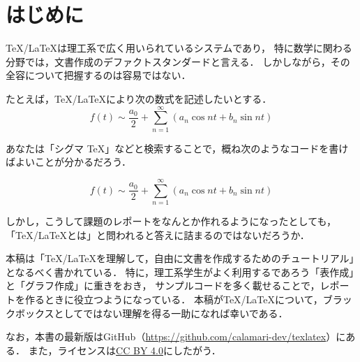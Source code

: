 \documentclass[../index]{subfiles}
\begin{document}
\chapter{はじめに}
\TeX /\LaTeX は理工系で広く用いられているシステムであり，
特に数学に関わる分野では，文書作成のデファクトスタンダードと言える．
しかしながら，その全容について把握するのは容易ではない．

たとえば，\TeX /\LaTeX により次の数式を記述したいとする．
\[
  f(t) \sim \frac{a_0}{2} + \sum_{n=1}^\infty (a_n\cos nt + b_n\sin nt)
\]

あなたは「シグマ TeX」などと検索することで，概ね次のようなコードを書けばよいことが分かるだろう．
\begin{codeblock}
\[
  f(t) \sim \frac{a_0}{2} + \sum_{n=1}^\infty (a_n\cos nt + b_n\sin nt)
\]
\end{codeblock}

しかし，こうして課題のレポートをなんとか作れるようになったとしても，
「\TeX /\LaTeX とは」と問われると答えに詰まるのではないだろうか．

本稿は「\TeX /\LaTeX を理解して，自由に文書を作成するためのチュートリアル」となるべく書かれている．
特に，理工系学生がよく利用するであろう「表作成」と「グラフ作成」に重きをおき，
サンプルコードを多く載せることで，レポートを作るときに役立つようになっている．
本稿が\TeX /\LaTeX について，ブラックボックスとしてではない理解を得る一助になれば幸いである．

なお，本書の最新版はGitHub（\url{https://github.com/calamari-dev/texlatex}）にある．
また，ライセンスは\href{https://creativecommons.org/licenses/by/4.0/deed.en}{CC BY 4.0}にしたがう．
\end{document}
